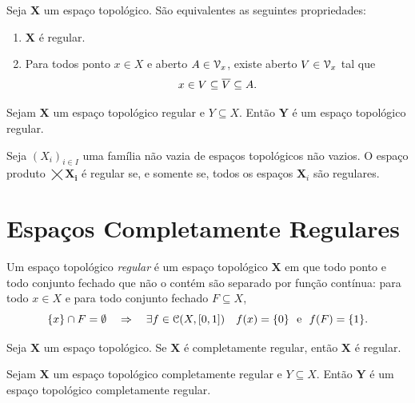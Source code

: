 \begin{prop}
	Seja $\bm X$ um espaço topológico. São equivalentes as seguintes propriedades:
	\begin{enumerate}
	\item $\bm X$ é regular.
	\item Para todos ponto $x \in X$ e aberto $A \in \mathcal{V}_x$, existe aberto $V \in \mathcal{V}_x$ tal que
		\begin{equation*}
		x \in V \subseteq \overline{V} \subseteq A.
		\end{equation*}
	\end{enumerate}
\end{prop}

\begin{prop}
	Sejam $\bm X$ um espaço topológico regular e $Y \subseteq X$. Então $\bm Y$ é um espaço topológico regular.
\end{prop}

\begin{prop}
	Seja $(X_i)_{i \in I}$ uma família não vazia de espaços topológicos não vazios. O espaço produto $\bm{\bigtimes X_i}$ é regular se, e somente se, todos os espaços $\bm X_i$ são regulares.
\end{prop}

\section{Espaços Completamente Regulares}

\begin{defi}
	Um espaço topológico \emph{regular} é um espaço topológico $\bm X$ em que todo ponto e todo conjunto fechado que não o contém são separado por função contínua: para todo $x \in X$ e para todo conjunto fechado $F \subseteq X$,
	\begin{equation*}
	\{x\} \cap F=\emptyset \quad \Rightarrow \quad \exists f \in \mathcal{C}(X,[0,1]) \quad f(x)=\{0\} \text{\ \ e\ \ } f(F)=\{1\}.
	\end{equation*}
\end{defi}

\begin{prop}
	Seja $\bm X$ um espaço topológico. Se $\bm X$ é completamente regular, então $\bm X$ é regular.
\end{prop}

\begin{prop}
	Sejam $\bm X$ um espaço topológico completamente regular e $Y \subseteq X$. Então $\bm Y$ é um espaço topológico completamente regular.
\end{prop}

